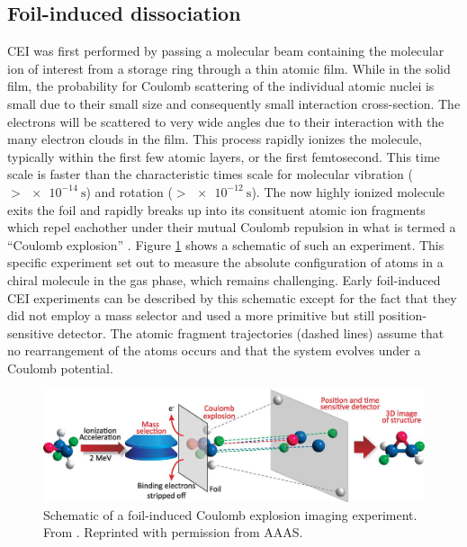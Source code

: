 
\subsection{Foil-induced dissociation}
CEI was first performed by passing a molecular beam containing the molecular ion of interest from a storage ring through a thin atomic film. While in the solid film, the probability for Coulomb scattering of the individual atomic nuclei is small due to their small size and consequently small interaction cross-section. The electrons will be scattered to very wide angles due to their interaction with the many electron clouds in the film. This process rapidly ionizes the molecule, typically within the first few atomic layers, or the first femtosecond. This time scale is faster than the characteristic times scale for molecular vibration ($>\SI{e-14}{\s}$) and rotation ($>\SI{e-12}{\s}$). The now highly ionized molecule exits the foil and rapidly breaks up into its consituent atomic ion fragments which repel eachother under their mutual Coulomb repulsion in what is termed a ``Coulomb explosion'' \citep{Vager89}. Figure \ref{fig:foilExperiment} shows a schematic of such an experiment. This specific experiment set out to measure the absolute configuration of atoms in a chiral molecule in the gas phase, which remains challenging. Early foil-induced CEI experiments can be described by this schematic except for the fact that they did not employ a mass selector and used a more primitive but still position-sensitive detector.  The atomic fragment trajectories (dashed lines) assume that no rearrangement of the atoms occurs and that the system evolves under a Coulomb potential.

\begin{figure}
  \centering
  \includegraphics[width=\textwidth]{gfx/FoilExperiment}
  \caption[Schematic of a foil-induced Coulomb explosion imaging experiment.]
  {Schematic of a foil-induced Coulomb explosion imaging experiment. From \citet{Herwig13}. Reprinted with permission from AAAS.}
  \label{fig:foilExperiment}
\end{figure}

